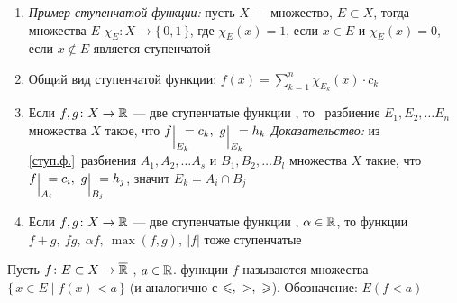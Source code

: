 \begin{zam}[https://www.youtube.com/live/D_Nn53jVQxE?si=TLomW6CsIG2IkY16&t=7983]\begin{enumerate}\makeatletter\renewcommand{\p@enumi}{\thezam.}\makeatother
	\item\label{характ.функц.} \textit{Пример ступенчатой функции:} пусть $X$ --- множество, $E \subset X$, тогда   множества $E$ $\chi_E  \colon X \to \{\,0, 1\,\}$, где $\chi_E(x) = 1$, если $x \in E$ и $\chi_E(x) = 0$, если $x \notin E$ является ступенчатой 
	
	\item Общий вид ступенчатой функции:  $f(x) = \sum\limits_{k = 1}^n \chi_{E_k} (x) \cdot c_k$ 
	
	\item\label{общ.разб.} Если $f, g \colon X \to \mathbb R$ --- две ступенчатые функции , то\E\  разбиение $E_1, E_2, \ldots E_n$ множества $X$ такое, что  $f \su{E_k} =  c_k,\ g\su{E_k} = h_k$ \linebreak \textit{Доказательство:} из \ref{ступ.ф.}\E\ разбиения $A_1, A_2, \ldots A_s$ и $B_1, B_2, \ldots B_l$ множества $X$ такие, что  $f \su{A_i} = c_i,\ g\su{B_j} = h_j$, значит $E_k = A_i \cap B_j$ 
	
	\item\label{произв.ступ.} Если $f, g \colon X \to \mathbb R$ --- две ступенчатые функции , $\alpha \in \mathbb R$, то функции $f + g,\ fg,\ \alpha f,\ \max(f, g),\ |f|$ тоже ступенчатые 
\end{enumerate}\end{zam}

\begin{opr}\label{лебег.мн.}
	\!Пусть $f \colon E \subset X \to \overline {\mathbb R}$ , $a \in \mathbb R$.\! \! функции $f$ называются множества \!$\{\, x \in E \mid f(x) < a\,\}$ \!(и аналогично с $\<,\ >,\ \biger$).\! Обозначение: $E(f < a)$
\end{opr}

